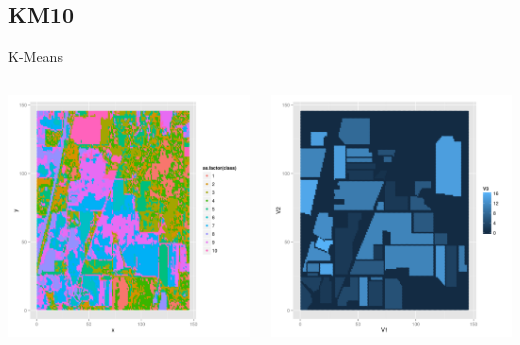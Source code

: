 \documentclass[11pt]{beamer}
\begin{document}
\subsection{KM10}
\begin{frame}{K-Means}
\begin{columns}[T]
\begin{column}{.48\textwidth}
\includegraphics[scale=.3]{km10.png}
\end{column}
\hfill
\begin{column}{.48\textwidth}
\includegraphics[scale=.3]{gt.png}
\end{column}
\end{columns}
\end{frame}
\end{document}

